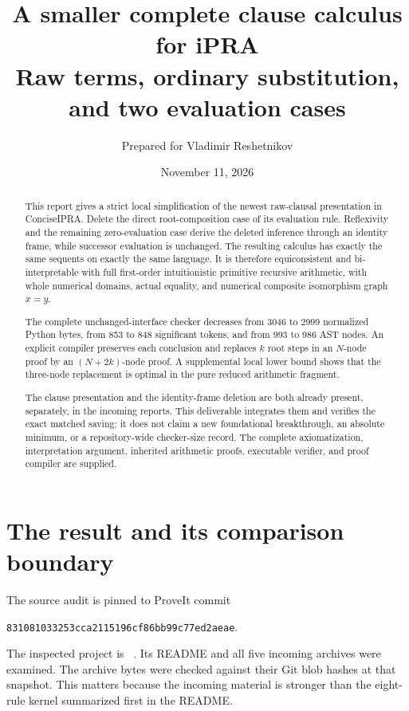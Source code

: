 \documentclass[11pt,letterpaper]{article}
\title{\textbf{A smaller complete clause calculus for iPRA}\\[5pt]
  \large Raw terms, ordinary substitution, and two evaluation cases}
\author{Prepared for Vladimir Reshetnikov}
\date{November 11, 2026}
\theoremstyle{definition}
\begin{document}
\maketitle
\begin{abstract}
This report gives a strict local simplification of the newest raw-clausal
presentation in ConciseIPRA. Delete the direct root-composition case of
its evaluation rule. Reflexivity and the remaining zero-evaluation case
derive the deleted inference through an identity frame, while successor
evaluation is unchanged. The resulting calculus has exactly the same
sequents on exactly the same language. It is therefore equiconsistent
and bi-interpretable with full first-order intuitionistic primitive
recursive arithmetic, with whole numerical domains, actual equality,
and numerical composite isomorphism graph $x=y$.

The complete unchanged-interface checker decreases from 3046 to 2999
normalized Python bytes, from 853 to 848 significant tokens, and from
993 to 986 AST nodes. An explicit compiler preserves each conclusion
and replaces $k$ root steps in an $N$-node proof by an $(N+2k)$-node
proof. A supplemental local lower bound shows that the three-node
replacement is optimal in the pure reduced arithmetic fragment.

The clause presentation and the identity-frame deletion are both
already present, separately, in the incoming reports. This deliverable
integrates them and verifies the exact matched saving; it does not
claim a new foundational breakthrough, an absolute minimum, or a
repository-wide checker-size record. The complete axiomatization,
interpretation argument, inherited arithmetic proofs, executable
verifier, and proof compiler are supplied.
\end{abstract}
\clearpage
\tableofcontents
\clearpage

\section{The result and its comparison boundary}
\label{sec:result}

The source audit is pinned to ProveIt commit
\begin{center}\small\texttt{831081033253cca2115196cf86bb99c77ed2aeae}.\end{center}
The inspected project is
~\cite{repo}.
Its README and all five incoming archives were examined. The archive
bytes were checked against their Git blob hashes at that snapshot.
This matters because the incoming material is stronger than the
eight-rule kernel summarized first in the README.
\end{document}

